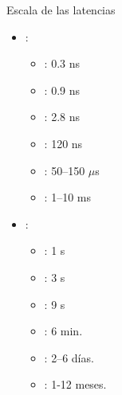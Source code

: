 \begin{frame}[t]{Escala de las latencias}
\begin{itemize}
  \item {}:
    \begin{itemize}
      \item {}: 0.3 ns
      \item {}: 0.9 ns
      \item {}: 2.8 ns
      \item {}: 120 ns
      \item {}: 50--150 $\mu$s 
      \item {}: 1--10 ms
    \end{itemize}

  \pause
  \item {}:
    \begin{itemize}
      \item {}: 1 s
      \item {}: 3 s
      \item {}: 9 s
      \item {}: 6 min.
      \item {}: 2--6 días.
      \item {}: 1-12 meses.
    \end{itemize}
\end{itemize}
\end{frame}

